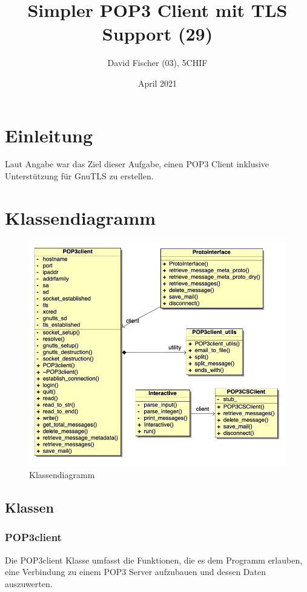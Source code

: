 \documentclass[12pt, letterpaper]{article}
\title{Simpler POP3 Client mit TLS Support (29)}
\author{David Fischer (03), 5CHIF}
\date{April 2021}
\begin{document}
\begin{titlepage}
\maketitle
\end{titlepage}

\tableofcontents
\newpage

\section{Einleitung}
Laut Angabe war das Ziel dieser Aufgabe, einen POP3 Client inklusive Unterstützung für GnuTLS\cite{gnutls} zu erstellen.

\section{Klassendiagramm}

\begin{figure}[H]
  \centering
  \includegraphics[width=.7\textwidth]{kdg.png}
  \caption{Klassendiagramm}
  \label{fig:kdg}
\end{figure}

\subsection{Klassen}

\subsubsection{POP3client}
Die POP3client Klasse umfasst die Funktionen, die es dem Programm erlauben, eine Verbindung zu einem POP3 Server aufzubauen und dessen Daten auszuwerten.
\end{document}
